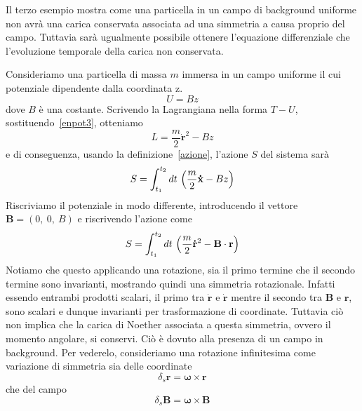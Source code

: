     Il terzo esempio mostra come una particella in un campo di background uniforme non avrà una carica conservata associata ad una simmetria a causa proprio del campo. Tuttavia sarà ugualmente possibile ottenere l'equazione differenziale che l'evoluzione temporale della carica non conservata.

    \begin{example} 
        Consideriamo una particella di massa $m$ immersa in un campo uniforme il cui potenziale dipendente dalla coordinata z. 
    \begin{equation}\label{enpot3}
        U = B z
    \end{equation}
    dove $B$ è una costante. Scrivendo la Lagrangiana nella forma $T - U$, sostituendo~\eqref{enpot3}, otteniamo 
    \begin{equation} \label{lag3}
        L = \frac{m}{2} \mathbf{\dot r}^2 - B z
    \end{equation}
        e di conseguenza, usando la definizione~\eqref{azione}, l'azione $S$ del sistema sarà
    \begin{equation}
        S = \int_{t_1}^{t_2}dt~ \Big( \frac{m}{2} \mathbf{\dot x} - B z \Big)
    \end{equation}
        Riscriviamo il potenziale in modo differente, introducendo il vettore $\mathbf B = (0,~0,~B)$ e riscrivendo l'azione come
    \begin{equation}
        S = \int_{t_1}^{t_2}dt~ \Big( \frac{m}{2} \mathbf{\dot r}^2 - \mathbf B \cdot \mathbf r \Big)
    \end{equation}
        Notiamo che questo applicando una rotazione, sia il primo termine che il secondo termine sono invarianti, mostrando quindi una simmetria rotazionale. Infatti essendo entrambi prodotti scalari, il primo tra $\mathbf{\dot r}$ e $\mathbf{\dot r}$ mentre il secondo tra $\mathbf B$ e $\mathbf r$, sono scalari e dunque invarianti per trasformazione di coordinate. Tuttavia ciò non implica che la carica di Noether associata a questa simmetria, ovvero il momento angolare, si conservi. Ciò è dovuto alla presenza di un campo in background. Per vederelo, consideriamo una rotazione infinitesima come variazione di simmetria sia delle coordinate 
    \begin{equation}
        \delta_s \mathbf r = \boldsymbol \omega \times \mathbf r
    \end{equation}
        che del campo
    \begin{equation}
        \delta_s \mathbf B = \boldsymbol \omega \times \mathbf B

\end{equation}
\end{example}
